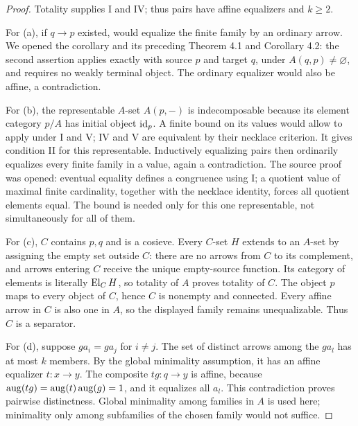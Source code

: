 \begin{proof}
Totality supplies I and IV; thus pairs have affine equalizers
and $k\geq2$.

For (a), if $q\to p$ existed,
\citet[Corollary 4.3, p.~297]{IsbellMitchell1976} would equalize
the finite family by an ordinary arrow. We opened the corollary
and its preceding Theorem 4.1 and Corollary 4.2: the second
assertion applies exactly with source $p$ and target $q$, under
$A(q,p)\ne\varnothing$, and requires no weakly terminal object.
The ordinary equalizer would also be affine, a contradiction.

For (b), the representable $A$-set $A(p,-)$ is indecomposable
because its element category $p/A$ has initial object $\operatorname{id}_p$.
A finite bound on its values would allow
\citet[Proposition 4.5, pp.~297--298]{IsbellMitchell1976} to
apply under I and V; IV and V are equivalent by their necklace
criterion. It gives condition II for this representable.
Inductively equalizing pairs then ordinarily equalizes every
finite family in a value, again a contradiction. The source
proof was opened: eventual equality defines a congruence using
I; a quotient value of maximal finite cardinality, together
with the necklace identity, forces all quotient elements equal.
The bound is needed only for this one representable, not
simultaneously for all of them.

For (c), $C$ contains $p,q$ and is a cosieve. Every $C$-set
$H$ extends to an $A$-set by assigning the empty set outside
$C$: there are no arrows from $C$ to its complement, and arrows
entering $C$ receive the unique empty-source function. Its
category of elements is literally $\operatorname{El}_CH$, so totality of $A$
proves totality of $C$. The object $p$ maps to every object of
$C$, hence $C$ is nonempty and connected. Every affine arrow
in $C$ is also one in $A$, so the displayed family remains
unequalizable. Thus $C$ is a separator.

For (d), suppose $ga_i=ga_j$ for $i\ne j$. The set of distinct
arrows among the $ga_l$ has at most $k$ members. By the global
minimality assumption, it has an affine equalizer
$t:x\to y$. The composite $tg:q\to y$ is affine, because
$\operatorname{aug}(tg)=\operatorname{aug}(t)\operatorname{aug}(g)=1$, and it equalizes all $a_l$.
This contradiction proves pairwise distinctness. Global
minimality among families in $A$ is used here; minimality only
among subfamilies of the chosen family would not suffice.
\end{proof}
